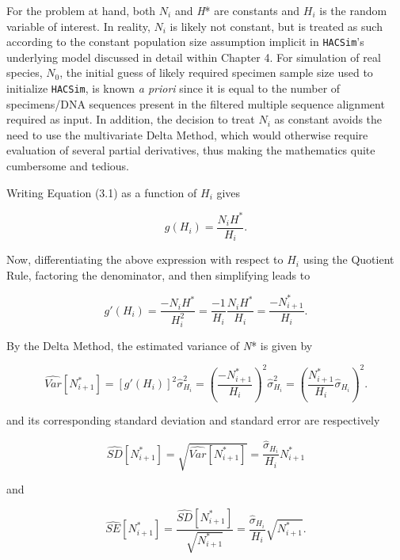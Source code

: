 For the problem at hand, both $N_i$ and \textit{H}* are constants and $H_i$ is the random variable of interest. In reality, $N_i$ is likely not constant, but is treated as such according to the constant population size assumption implicit in {\tt HACSim}'s underlying model discussed in detail within Chapter 4. For simulation of real species, $N_0$, the initial guess of likely required specimen sample size used to initialize {\tt HACSim}, is known \textit{a priori} since it is equal to the number of specimens/DNA sequences present in the filtered multiple sequence alignment required as input. In addition, the decision to treat $N_i$ as constant avoids the need to use the multivariate Delta Method, which would otherwise require evaluation of several partial derivatives, thus making the mathematics quite cumbersome and tedious.  

Writing Equation (3.1) as a function of $H_i$ gives

\begin{equation}
g(H_i) = \frac{N_iH^*}{H_i}.
\end{equation}

Now, differentiating the above expression with respect to $H_i$ using the Quotient Rule, factoring the denominator, and then simplifying leads to

\begin{equation}
g'(H_i) = \frac{-N_iH^*}{H_i^2} = \frac{-1}{H_i}\frac{N_iH^*}{H_i} = \frac{-N^*_{i+1}}{H_i}.
\end{equation}

By the Delta Method, the estimated variance of \textit{N}* is given by

\begin{equation}
\widehat{Var}[N^*_{i+1}] = [g'(H_i)]^2\hat{\sigma}^2_{H_i} = \left(\frac{-N^*_{i+1}}{H_i}\right)^2\hat{\sigma}^2_{H_i} = \left(\frac{N^*_{i+1}}{H_i}\hat{\sigma}_{H_i}\right)^2.
\end{equation}

\noindent and its corresponding standard deviation and standard error are respectively

\begin{equation}
\widehat{SD}[N^*_{i+1}] = \sqrt{\widehat{Var}[N^*_{i+1}]} = \frac{\hat{\sigma}_{H_i}}{H_i}N^*_{i+1}
\end{equation}

\noindent and

\begin{equation}
\widehat{SE}[N^*_{i+1}] = \frac{\widehat{SD}[N^*_{i+1}]}{\sqrt{N^*_{i+1}}} = \frac{\hat{\sigma}_{H_i}}{H_i}\sqrt{N^*_{i+1}}.
\end{equation}

